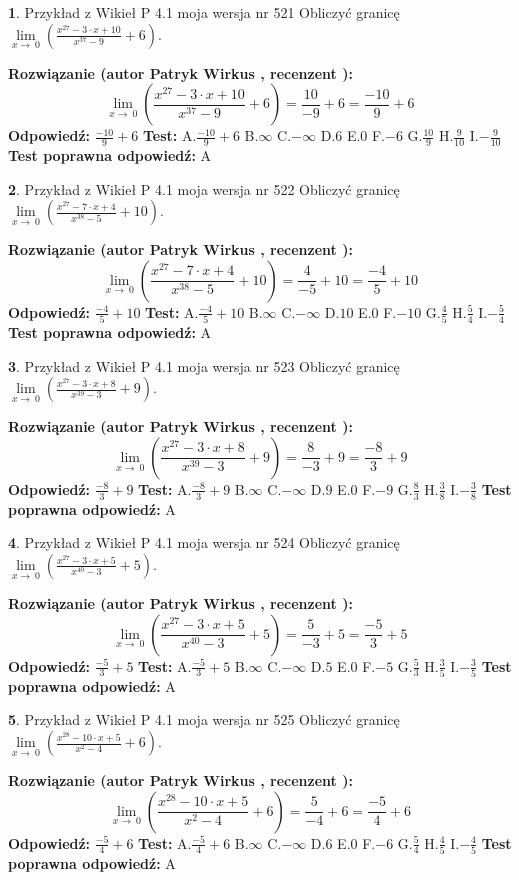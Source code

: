 \documentclass[12pt, a4paper]{article}
\theoremstyle{definition} %
\newtheorem{zad}{}
\newcommand{\zadStart}[1]{\begin{zad}#1\newline}
\newcommand{\zadStop}{\end{zad}}
\newcommand{\rozwStart}[2]{\noindent \textbf{Rozwiązanie (autor #1 , recenzent #2): }\newline}
\newcommand{\rozwStop}{\newline}
\newcommand{\odpStart}{\noindent \textbf{Odpowiedź:}\newline}
\newcommand{\odpStop}{\newline}
\newcommand{\testStart}{\noindent \textbf{Test:}\newline}
\newcommand{\testStop}{\newline}
\newcommand{\kluczStart}{\noindent \textbf{Test poprawna odpowiedź:}\newline}
\newcommand{\kluczStop}{\newline}
\begin{document}
\zadStart{Przykład z Wikieł P 4.1 moja wersja nr 521}
Obliczyć granicę $\lim\limits_{x\to\ 0}(\frac{x^{27}-3 \cdot x +10}{x^{37}-9}+6)$.
\zadStop
\rozwStart{Patryk Wirkus}{}
$$\lim\limits_{x\to\ 0}(\frac{x^{27}-3 \cdot x +10}{x^{37}-9}+6)=\frac{10}{-9}+6=\frac{-10}{9}+6$$
\rozwStop
\odpStart
$\frac{-10}{9}+6$
\odpStop
\testStart
A.$\frac{-10}{9}+6$
B.$\infty$
C.$-\infty$
D.$6$
E.$0$
F.$-6$
G.$\frac{10}{9}$
H.$\frac{9}{10}$
I.$-\frac{9}{10}$
\testStop
\kluczStart
A
\kluczStop



\zadStart{Przykład z Wikieł P 4.1 moja wersja nr 522}
Obliczyć granicę $\lim\limits_{x\to\ 0}(\frac{x^{27}-7 \cdot x +4}{x^{38}-5}+10)$.
\zadStop
\rozwStart{Patryk Wirkus}{}
$$\lim\limits_{x\to\ 0}(\frac{x^{27}-7 \cdot x +4}{x^{38}-5}+10)=\frac{4}{-5}+10=\frac{-4}{5}+10$$
\rozwStop
\odpStart
$\frac{-4}{5}+10$
\odpStop
\testStart
A.$\frac{-4}{5}+10$
B.$\infty$
C.$-\infty$
D.$10$
E.$0$
F.$-10$
G.$\frac{4}{5}$
H.$\frac{5}{4}$
I.$-\frac{5}{4}$
\testStop
\kluczStart
A
\kluczStop



\zadStart{Przykład z Wikieł P 4.1 moja wersja nr 523}
Obliczyć granicę $\lim\limits_{x\to\ 0}(\frac{x^{27}-3 \cdot x +8}{x^{39}-3}+9)$.
\zadStop
\rozwStart{Patryk Wirkus}{}
$$\lim\limits_{x\to\ 0}(\frac{x^{27}-3 \cdot x +8}{x^{39}-3}+9)=\frac{8}{-3}+9=\frac{-8}{3}+9$$
\rozwStop
\odpStart
$\frac{-8}{3}+9$
\odpStop
\testStart
A.$\frac{-8}{3}+9$
B.$\infty$
C.$-\infty$
D.$9$
E.$0$
F.$-9$
G.$\frac{8}{3}$
H.$\frac{3}{8}$
I.$-\frac{3}{8}$
\testStop
\kluczStart
A
\kluczStop



\zadStart{Przykład z Wikieł P 4.1 moja wersja nr 524}
Obliczyć granicę $\lim\limits_{x\to\ 0}(\frac{x^{27}-3 \cdot x +5}{x^{40}-3}+5)$.
\zadStop
\rozwStart{Patryk Wirkus}{}
$$\lim\limits_{x\to\ 0}(\frac{x^{27}-3 \cdot x +5}{x^{40}-3}+5)=\frac{5}{-3}+5=\frac{-5}{3}+5$$
\rozwStop
\odpStart
$\frac{-5}{3}+5$
\odpStop
\testStart
A.$\frac{-5}{3}+5$
B.$\infty$
C.$-\infty$
D.$5$
E.$0$
F.$-5$
G.$\frac{5}{3}$
H.$\frac{3}{5}$
I.$-\frac{3}{5}$
\testStop
\kluczStart
A
\kluczStop



\zadStart{Przykład z Wikieł P 4.1 moja wersja nr 525}
Obliczyć granicę $\lim\limits_{x\to\ 0}(\frac{x^{28}-10 \cdot x +5}{x^{2}-4}+6)$.
\zadStop
\rozwStart{Patryk Wirkus}{}
$$\lim\limits_{x\to\ 0}(\frac{x^{28}-10 \cdot x +5}{x^{2}-4}+6)=\frac{5}{-4}+6=\frac{-5}{4}+6$$
\rozwStop
\odpStart
$\frac{-5}{4}+6$
\odpStop
\testStart
A.$\frac{-5}{4}+6$
B.$\infty$
C.$-\infty$
D.$6$
E.$0$
F.$-6$
G.$\frac{5}{4}$
H.$\frac{4}{5}$
I.$-\frac{4}{5}$
\testStop
\kluczStart
A
\kluczStop
\end{document}
